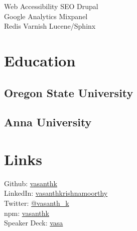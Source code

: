 \documentclass[]{my-resume-openfont}
\begin{document}
\begin{minipage}[t]{0.33\textwidth}
Web Accessibility \textbullet{} SEO \textbullet{} Drupal \\
Google Analytics \textbullet{} Mixpanel \\
Redis \textbullet{} Varnish \textbullet{}  Lucene/Sphinx \\
\sectionsep


\section{Education}

\subsection{Oregon State University}
\sectionsep

\subsection{Anna University}
\sectionsep


\section{Links}
Github: \href{https://github.com/vasanthk}{vasanthk} \\
LinkedIn: \href{https://www.linkedin.com/in/vasanthkrishnamoorthy}{vasanthkrishnamoorthy} \\
Twitter: \href{https://twitter.com/vasanth_k}{@vasanth\_k} \\
npm: \href{https://www.npmjs.com/~vasanthk}{vasanthk} \\
Speaker Deck: \href{https://speakerdeck.com/vasa}{vasa}
\sectionsep

%
%

\end{minipage}
\hfill
\end{document}
